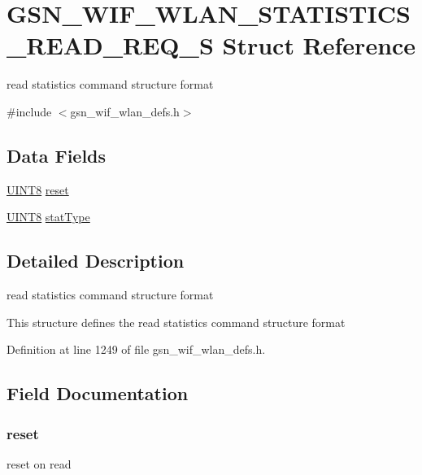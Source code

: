\hypertarget{a00406}{
\section{GSN\_\-WIF\_\-WLAN\_\-STATISTICS\_\-READ\_\-REQ\_\-S Struct Reference}
\label{a00406}
}


read statistics command structure format  




{\ttfamily \#include $<$gsn\_\-wif\_\-wlan\_\-defs.h$>$}

\subsection*{Data Fields}
\begin{DoxyCompactItemize}
\item 
\hyperlink{a00660_gab27e9918b538ce9d8ca692479b375b6a}{UINT8} \hyperlink{a00406_a75c303e6140d8bed58557cc195afb73f}{reset}
\item 
\hyperlink{a00660_gab27e9918b538ce9d8ca692479b375b6a}{UINT8} \hyperlink{a00406_ace1deff0d018b5cea37667c8eaed18ed}{statType}
\end{DoxyCompactItemize}


\subsection{Detailed Description}
read statistics command structure format 

This structure defines the read statistics command structure format 

Definition at line 1249 of file gsn\_\-wif\_\-wlan\_\-defs.h.



\subsection{Field Documentation}
\hypertarget{a00406_a75c303e6140d8bed58557cc195afb73f}{
\subsubsection[{reset}]{ {\bf reset}}}
\label{a00406_a75c303e6140d8bed58557cc195afb73f}
reset on read 

